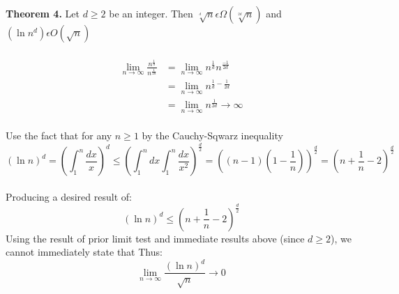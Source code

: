 \documentclass[12pt]{article}
\begin{document}
\noindent \textbf{Theorem 4.} Let \begin{math}d \geq 2\end{math} be an integer. Then \begin{math}\sqrt[^d]{n} \epsilon \Omega (\sqrt[^{2d}]{n})\end{math} and \begin{math}(\ln {n}^d) \epsilon O(\sqrt{n})\end{math}\\\\
\begin{align}
\lim_{n\to\infty} \frac{n^{\frac{1}{d}}}{n^{\frac{1}{2d}}} &= \lim_{n\to\infty} n^{\frac{1}{d}} n^{\frac{-1}{2d}}\\
&= \lim_{n\to\infty} n^{\frac{1}{d}-\frac{1}{2d}}\\
&= \lim_{n\to\infty} n^{\frac{1}{2d}} \rightarrow \infty
\end{align}\\
Use the fact that for any \begin{math} n  \geq 1\end{math} by the Cauchy-Sqwarz inequality\
\[(\ln{n})^d = (\int_{1}^{n} \frac{dx}{x})^d \leq (\int_{1}^{n} dx \int_{1}^{n} \frac{dx}{x^2})^{\frac{d}{2}} = ((n-1)(1-\frac{1}{n}))^{\frac{d}{2}} = (n + \frac{1}{n} - 2)^{\frac{d}{2}}\]\\
Producing a desired result of:
\[(\ln{n})^d \leq (n + \frac{1}{n} - 2)^{\frac{d}{2}}\]
Using the result of prior limit test and immediate results above (since \begin{math}d \geq 2\end{math}), we cannot immediately state that 
Thus:
\[\lim_{n\to\infty} \frac{(\ln{n})^d}{\sqrt{n}} \rightarrow 0\]
\end{document}
